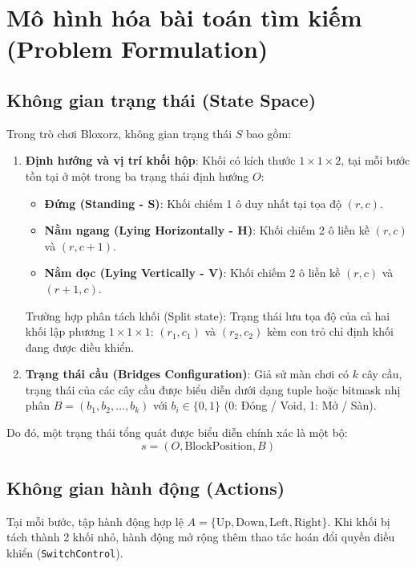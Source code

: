 \chapter{Mô hình hóa bài toán tìm kiếm (Problem Formulation)}

\newpage

\section{Không gian trạng thái (State Space)}
Trong trò chơi Bloxorz, không gian trạng thái $S$ bao gồm:
\begin{enumerate}
    \item \textbf{Định hướng và vị trí khối hộp}:
    Khối có kích thước $1 \times 1 \times 2$, tại mỗi bước tồn tại ở một trong ba trạng thái định hướng $O$:
    \begin{itemize}
        \item \textbf{Đứng (Standing - S)}: Khối chiếm 1 ô duy nhất tại tọa độ $(r, c)$.
        \item \textbf{Nằm ngang (Lying Horizontally - H)}: Khối chiếm 2 ô liền kề $(r, c)$ và $(r, c + 1)$.
        \item \textbf{Nằm dọc (Lying Vertically - V)}: Khối chiếm 2 ô liền kề $(r, c)$ và $(r + 1, c)$.
    \end{itemize}
    Trường hợp phân tách khối (Split state): Trạng thái lưu tọa độ của cả hai khối lập phương $1 \times 1 \times 1$: $(r_1, c_1)$ và $(r_2, c_2)$ kèm con trỏ chỉ định khối đang được điều khiển.
    
    \item \textbf{Trạng thái cầu (Bridges Configuration)}:
    Giả sử màn chơi có $k$ cây cầu, trạng thái của các cây cầu được biểu diễn dưới dạng tuple hoặc bitmask nhị phân $B = (b_1, b_2, \dots, b_k)$ với $b_i \in \{0, 1\}$ (0: Đóng / Void, 1: Mở / Sàn).
\end{enumerate}
Do đó, một trạng thái tổng quát được biểu diễn chính xác là một bộ:
\begin{equation}
    s = (O, \text{BlockPosition}, B)
\end{equation}

\section{Không gian hành động (Actions)}
Tại mỗi bước, tập hành động hợp lệ $A = \{\text{Up}, \text{Down}, \text{Left}, \text{Right}\}$. Khi khối bị tách thành 2 khối nhỏ, hành động mở rộng thêm thao tác hoán đổi quyền điều khiển (\texttt{SwitchControl}).

